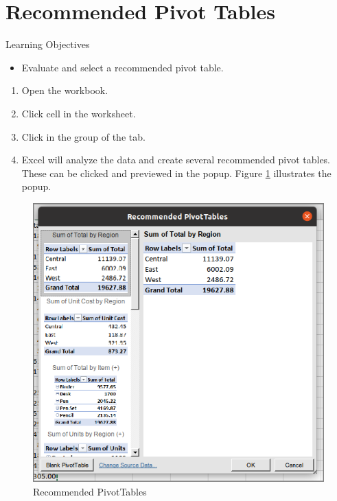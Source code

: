 \section{Recommended Pivot Tables}

\begin{center}
	\begin{objbox}{Learning Objectives}
		\begin{itemize}
			\setlength{\itemsep}{0pt}
			\setlength{\parskip}{0pt}
			\setlength{\parsep}{0pt}
			
			\item Evaluate and select a recommended pivot table.
			
		\end{itemize}
	\end{objbox}
\end{center}

\begin{enumerate}
	\item Open the  workbook.
	\item Click cell  in the  worksheet.
	\item Click  in the  group of the  tab.
	\item Excel will analyze the data and create several recommended pivot tables. These can be clicked and previewed in the  popup. Figure \ref{07:fig26} illustrates the  popup.
\end{enumerate}

\begin{figure}[H]
	\centering
	\includegraphics[width=\maxwidth{.95\linewidth}]{gfx/ch07_fig26}
	\caption{Recommended PivotTables}
	\label{07:fig26}
\end{figure}

